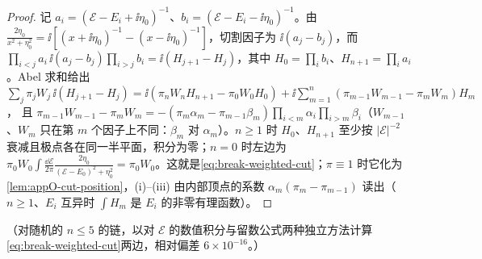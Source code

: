 \begin{proof}
记 $a_i=(\mathcal E-E_i+\ii\eta_0)^{-1}$、$b_i=(\mathcal E-E_i-\ii\eta_0)^{-1}$。由 $\frac{2\eta_0}{x^2+\eta_0^2}=\ii[(x+\ii\eta_0)^{-1}-(x-\ii\eta_0)^{-1}]$，切割因子为 $\ii(a_j-b_j)$，而 $\prod_{i<j}a_i\,\ii(a_j-b_j)\prod_{i>j}b_i=\ii(H_{j+1}-H_j)$，其中 $H_0=\prod_ib_i$、$H_{n+1}=\prod_ia_i$。Abel 求和给出
$\sum_j\pi_jW_j\,\ii(H_{j+1}-H_j)=\ii(\pi_nW_nH_{n+1}-\pi_0W_0H_0)+\ii\sum_{m=1}^n(\pi_{m-1}W_{m-1}-\pi_mW_m)H_m$，
且 $\pi_{m-1}W_{m-1}-\pi_mW_m=-(\pi_m\alpha_m-\pi_{m-1}\beta_m)\prod_{i<m}\alpha_i\prod_{i>m}\beta_i$（$W_{m-1}$、$W_m$ 只在第 $m$ 个因子上不同：$\beta_m$ 对 $\alpha_m$）。$n\ge1$ 时 $H_0$、$H_{n+1}$ 至少按 $|\mathcal E|^{-2}$ 衰减且极点各在同一半平面，积分为零；$n=0$ 时左边为 $\pi_0W_0\int\frac{\dd\mathcal E}{2\pi}\frac{2\eta_0}{(\mathcal E-E_0)^2+\eta_0^2}=\pi_0W_0$。这就是\cref{eq:break-weighted-cut}；$\pi\equiv1$ 时它化为\cref{lem:appO-cut-position}，(i)--(iii) 由内部顶点的系数 $\alpha_m(\pi_m-\pi_{m-1})$ 读出（$n\ge1$、$E_i$ 互异时 $\int H_m$ 是 $E_i$ 的非零有理函数）。
\end{proof}

（对随机的 $n\le5$ 的链，以对 $\mathcal E$ 的数值积分与留数公式两种独立方法计算\cref{eq:break-weighted-cut}两边，相对偏差 $6\times10^{-16}$。）

